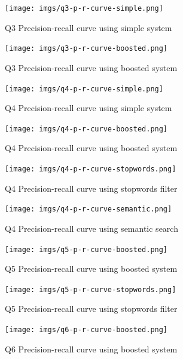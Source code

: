 \documentclass[sigconf]{acmart}
\begin{document}
\begin{figure}[H]
  \centering
  \texttt{[image: imgs/q3-p-r-curve-simple.png]}
  \caption{Q3 Precision-recall curve using simple system}
  \label{fig:q3_simple}
\end{figure}

\begin{figure}[H]
  \centering
  \texttt{[image: imgs/q3-p-r-curve-boosted.png]}
  \caption{Q3 Precision-recall curve using boosted system}
  \label{fig:q3_boosted}
\end{figure}

\begin{figure}[H]
  \centering
  \texttt{[image: imgs/q4-p-r-curve-simple.png]}
  \caption{Q4 Precision-recall curve using simple system}
  \label{fig:q4_simple}
\end{figure}

\begin{figure}[H]
  \centering
  \texttt{[image: imgs/q4-p-r-curve-boosted.png]}
  \caption{Q4 Precision-recall curve using boosted system}
  \label{fig:q4_boosted}
\end{figure}

\begin{figure}[H]
  \centering
  \texttt{[image: imgs/q4-p-r-curve-stopwords.png]}
  \caption{Q4 Precision-recall curve using stopwords filter}
  \label{fig:q4_stopwords}
\end{figure}

\begin{figure}[H]
  \centering
  \texttt{[image: imgs/q4-p-r-curve-semantic.png]}
  \caption{Q4 Precision-recall curve using  semantic search}
  \label{fig:q4_semantic}
\end{figure}


\begin{figure}[H]
  \centering
  \texttt{[image: imgs/q5-p-r-curve-boosted.png]}
  \caption{Q5 Precision-recall curve using boosted system}
  \label{fig:q5_boosted}
\end{figure}

\begin{figure}[H]
  \centering
  \texttt{[image: imgs/q5-p-r-curve-stopwords.png]}
  \caption{Q5 Precision-recall curve using stopwords filter}
  \label{fig:q5_stopwords}
\end{figure}

\begin{figure}[H]
  \centering
  \texttt{[image: imgs/q6-p-r-curve-boosted.png]}
  \caption{Q6 Precision-recall curve using boosted system}
  \label{fig:q6_boosted}
\end{figure}
\end{document}
